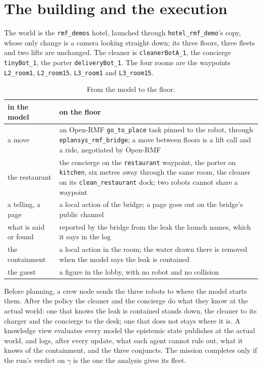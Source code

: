 \documentclass[11pt,a4paper]{article}
\theoremstyle{definition}
\newcommand{\code}[1]{\texttt{\small #1}}
\begin{document}
\section{The building and the execution}
\label{sec:floor}

The world is the \code{rmf\_demos} hotel, launched through \code{hotel\_rmf\_demo}'s
copy, whose only change is a camera looking straight down; its three floors,
three fleets and two lifts are unchanged. The cleaner is \code{cleanerBotA\_1},
the concierge \code{tinyBot\_1}, the porter \code{deliveryBot\_1}. The four rooms
are the waypoints \code{L2\_room1}, \code{L2\_room15}, \code{L3\_room1} and
\code{L3\_room15}.

\begin{table}[H]
\centering\small
\begin{tabularx}{\textwidth}{@{}l X@{}}
\toprule
in the model & on the floor \\
\midrule
a move & an Open-RMF \code{go\_to\_place} task pinned to the robot, through
\code{eplansys\_rmf\_bridge}; a move between floors is a lift call and a ride,
negotiated by Open-RMF \\
the restaurant & the concierge on the \code{restaurant} waypoint, the porter on
\code{kitchen}, six metres away through the same room, the cleaner on its
\code{clean\_restaurant} dock; two robots cannot share a waypoint \\
a telling, a page & a local action of the bridge; a page goes out on the
bridge's public channel \\
what is said or found & reported by the bridge from the leak the launch names,
which it says in the log \\
the containment & a local action in the room; the water drawn there is removed
when the model says the leak is contained \\
the guest & a figure in the lobby, with no robot and no collision \\
\bottomrule
\end{tabularx}
\caption{From the model to the floor.}
\label{tab:floor}
\end{table}

Before planning, a crew node sends the three robots to where the model starts
them. After the policy the cleaner and the concierge do what they know at the
actual world: one that knows the leak is contained stands down, the cleaner to
its charger and the concierge to the desk; one that does not stays where it is.
A knowledge view evaluates every model the epistemic state publishes at the
actual world, and logs, after every update, what each agent cannot rule out,
what it knows of the containment, and the three conjuncts. The mission completes
only if the run's verdict on $\gamma$ is the one the analysis gives its fleet.
\end{document}

